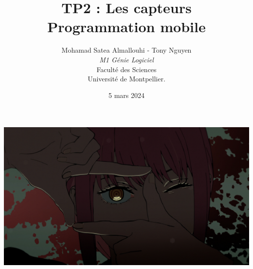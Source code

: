 \documentclass[a4paper]{article}
\title{  TP2 : Les capteurs\\         %
  Programmation mobile}
\author{Mohamad Satea Almallouhi - Tony Nguyen\\
  \emph{M1 Génie Logiciel}\\
  Faculté des Sciences\\
Université de Montpellier.}
\date{5 mars 2024}
\begin{document}
    \maketitle
    \begin{center}
    \includegraphics[width=\textwidth]{makima}
    \end{center}

    \newpage
    \tableofcontents
\end{document}
